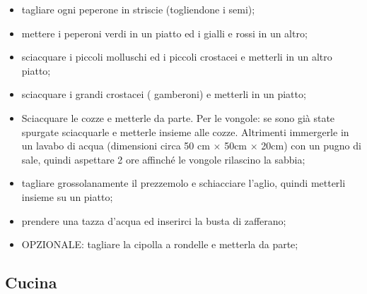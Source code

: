 \begin{itemize}
    \item tagliare ogni peperone in striscie (togliendone i semi);
    \item mettere i peperoni verdi in un piatto ed i gialli e rossi in un altro;
    \item sciacquare i piccoli molluschi ed i piccoli crostacei e metterli in un altro piatto;
    \item sciacquare i grandi crostacei (\eg{} gamberoni) e metterli in un piatto;
    \item Sciacquare le cozze e metterle da parte. Per le vongole: se sono già state spurgate sciacquarle e metterle insieme alle cozze. Altrimenti immergerle in un lavabo di acqua (dimensioni circa 50 cm $\times$ 50cm  $\times $ 20cm) con un pugno di sale, quindi aspettare 2 ore affinché le vongole rilascino la sabbia;
    \item tagliare grossolanamente il prezzemolo e schiacciare l'aglio, quindi metterli insieme su un piatto;
    \item prendere una tazza d'acqua ed inserirci la busta di zafferano;
    \item OPZIONALE: tagliare la cipolla a rondelle e metterla da parte;
\end{itemize}

\subsection{Cucina}

